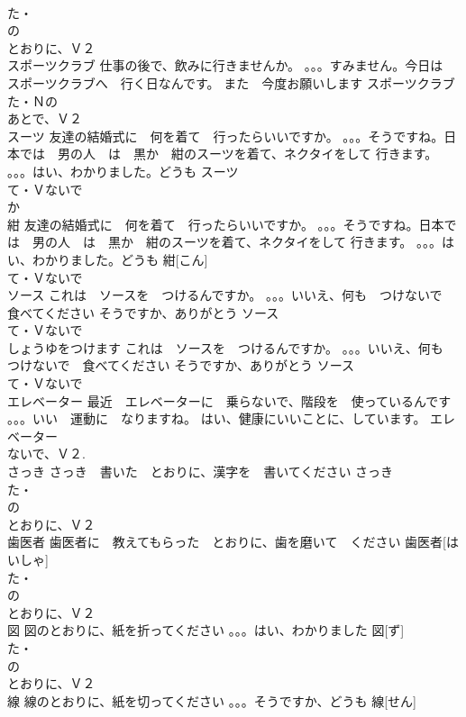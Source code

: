 \documentclass[8pt]{extreport}
\begin{document}
\begin{CJK}{UTF8}{min}
\\	た・
\\	の
\\	とおりに、Ｖ２
\\	スポーツクラブ	仕事の後で、飲みに行きませんか。 。。。すみません。今日は　スポーツクラブへ　行く日なんです。 また　今度お願いします	スポーツクラブ			
\\	た・Ｎの
\\	あとで、Ｖ２
\\	スーツ	友達の結婚式に　何を着て　行ったらいいですか。 。。。そうですね。日本では　男の人　は　黒か　紺のスーツを着て、ネクタイをして 行きます。 。。。はい、わかりました。どうも	スーツ			
\\	て・Ｖないで　
\\	か
\\	紺	友達の結婚式に　何を着て　行ったらいいですか。 。。。そうですね。日本では　男の人　は　黒か　紺のスーツを着て、ネクタイをして 行きます。 。。。はい、わかりました。どうも	紺[こん]			
\\	て・Ｖないで　
\\	ソース	これは　ソースを　つけるんですか。 。。。いいえ、何も　つけないで　食べてください そうですか、ありがとう	ソース			
\\	て・Ｖないで　
\\	しょうゆをつけます	これは　ソースを　つけるんですか。 。。。いいえ、何も　つけないで　食べてください そうですか、ありがとう	ソース			
\\	て・Ｖないで　
\\	エレベーター	最近　エレベーターに　乗らないで、階段を　使っているんです 。。。いい　運動に　なりますね。 はい、健康にいいことに、しています。	エレベーター			
\\	ないで、Ｖ２. 
\\	さっき	さっき　書いた　とおりに、漢字を　書いてください	さっき			
\\	た・
\\	の
\\	とおりに、Ｖ２
\\	歯医者	歯医者に　教えてもらった　とおりに、歯を磨いて　ください	歯医者[はいしゃ]			
\\	た・
\\	の
\\	とおりに、Ｖ２
\\	図	図のとおりに、紙を折ってください 。。。はい、わかりました	図[ず]			
\\	た・
\\	の
\\	とおりに、Ｖ２
\\	線	線のとおりに、紙を切ってください 。。。そうですか、どうも	線[せん]			

\end{CJK}
\end{document}
